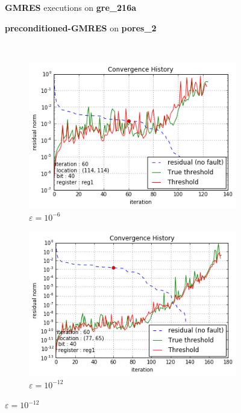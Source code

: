 \begin{figure}[h]
	\centering
    
\begin{minipage}[b]{0.45\linewidth}
\centering
\textbf{GMRES} executions on \textbf{gre_216a} 
\end{minipage}
\quad
\begin{minipage}{0.45\linewidth}
\centering
\textbf{preconditioned-GMRES} on \textbf{pores_2}
\end{minipage}\\


    \begin{minipage}[b]{0.48\linewidth}
	
	\begin{subfigure}[t]{\linewidth}
		\centering
		\includegraphics[width=1.1\linewidth]{figures/gre_216a/convergence_history_threshold_evaluation_0.png}
		\caption{$\varepsilon = 10^{-6}$}\label{fig:gre_216a_conv_hist_threshold_evaluation_0}	
	\end{subfigure}
    \quad
    \begin{subfigure}[t]{\linewidth}
		\centering
		\includegraphics[width=1.1\linewidth]{figures/gre_216a/convergence_history_threshold_evaluation_1.png}
		\caption{$\varepsilon = 10^{-12}$}\label{fig:gre_216a_conv_hist_threshold_evaluation_1}	
	\end{subfigure}
    \end{minipage}
    \quad
    \begin{minipage}[b]{0.48\linewidth}
    	

\end{minipage}
\end{figure}
